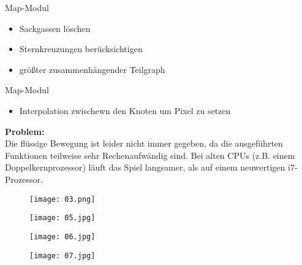 \documentclass{beamer}
\begin{document}
\begin{frame}{Map-Modul}
\begin{itemize}
\item Sackgassen löschen
\item Sternkreuzungen berücksichtigen
\item größter zusammenhängender Teilgraph
\end{itemize}
\end{frame}

\begin{frame}{Map-Modul}
\begin{itemize}
\item Interpolation zwischewn den Knoten um Pixel zu setzen
\end{itemize}
\textbf{Problem:}\\
Die flüssige Bewegung ist leider nicht immer gegeben, da die ausgeführten Funktionen teilweise sehr Rechenaufwändig sind.
Bei alten CPUs (z.B. einem Doppelkernprozessor) läuft das Spiel langsamer, als auf einem neuwertigen i7-Prozessor.

\end{frame}
\begin{frame}
\begin{figure}[htbp] 
  \centering
     \texttt{[image: 03.png]}
\end{figure}

\end{frame}
\begin{frame}
\begin{figure}[htbp] 
  \centering
     \texttt{[image: 05.jpg]}
\end{figure}

\end{frame}

\begin{frame}
\begin{figure}[htbp] 
  \centering
     \texttt{[image: 06.jpg]}
\end{figure}

\end{frame}
\begin{frame}
\begin{figure}[htbp] 
  \centering
     \texttt{[image: 07.jpg]}
\end{figure}

\end{frame}
\end{document}
